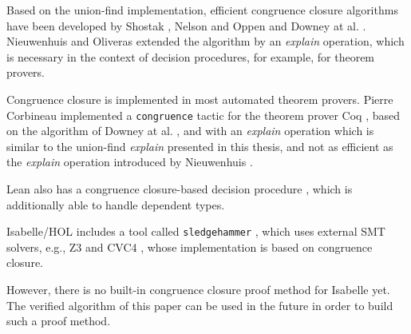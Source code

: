 Based on the union-find implementation, efficient congruence closure algorithms have been developed by Shostak \cite{congruenceclosure-og2}, Nelson and Oppen \cite{congruenceclosure-og} and Downey at al. \cite{congruenceclosure-og3}.
Nieuwenhuis and Oliveras \cite{Nieuwenhuis} extended the algorithm by an \emph{explain} operation, which is necessary in the context of decision procedures, for example, for theorem provers.

Congruence closure is implemented in most automated theorem provers. Pierre Corbineau implemented a \lstinline|congruence| tactic for the theorem prover Coq \cite{congruenceclosure-coq, congruence-coq}, based on the algorithm of Downey at al. \cite{congruenceclosure-og3}, and with an \emph{explain} operation which is similar to the union-find \emph{explain} presented in this thesis, and not as efficient as the \emph{explain} operation introduced by Nieuwenhuis \cite{Nieuwenhuis}.

Lean also has a congruence closure-based decision procedure \cite{congruenceclosure-lean}, which is additionally able to handle dependent types.

Isabelle/HOL includes a tool called \lstinline|sledgehammer| \cite{sledgehammer}, which uses external SMT solvers, e.g., Z3 \cite{z3} and CVC4 \cite{cvc4}, whose implementation is based on congruence closure.

However, there is no built-in congruence closure proof method for Isabelle yet. The verified algorithm of this paper can be used in the future in order to build such a proof method.
